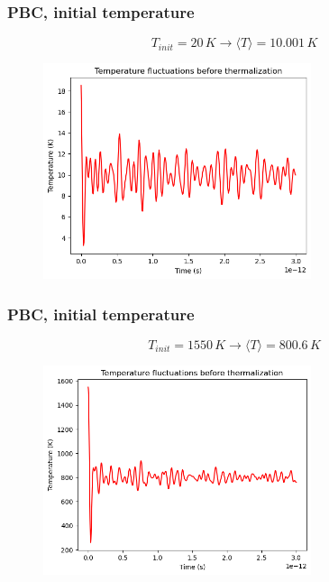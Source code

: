 \documentclass{beamer}
\begin{document}
\begin{frame}
    \frametitle{PBC, initial temperature}

    $$T_{init}=20\,K \rightarrow \langle T \rangle =10.001    \,K $$

    \begin{figure}
        \includegraphics[width=0.7\textwidth]{images/temp5.png}
    \end{figure}

\end{frame}


\begin{frame}
    \frametitle{PBC, initial temperature}

    $$T_{init}=1550\,K \rightarrow \langle T \rangle =  800.6    \,K $$

    \begin{figure}
        \includegraphics[width=0.7\textwidth]{images/temp5800k.png}
    \end{figure}

\end{frame}
\end{document}

